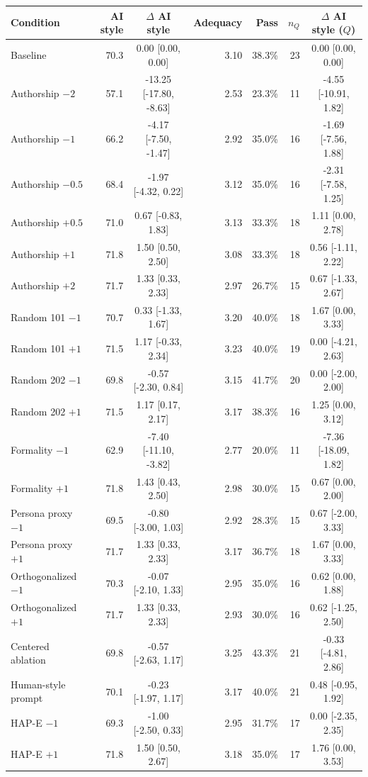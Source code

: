 \begin{tabular}{lrcrrrc}
\toprule
Condition & AI style & $\Delta$ AI style & Adequacy & Pass & $n_Q$ & $\Delta$ AI style ($Q$) \\
\midrule
Baseline & 70.3 & 0.00 [0.00, 0.00] & 3.10 & 38.3\% & 23 & 0.00 [0.00, 0.00] \\
Authorship $-2$ & 57.1 & -13.25 [-17.80, -8.63] & 2.53 & 23.3\% & 11 & -4.55 [-10.91, 1.82] \\
Authorship $-1$ & 66.2 & -4.17 [-7.50, -1.47] & 2.92 & 35.0\% & 16 & -1.69 [-7.56, 1.88] \\
Authorship $-0.5$ & 68.4 & -1.97 [-4.32, 0.22] & 3.12 & 35.0\% & 16 & -2.31 [-7.58, 1.25] \\
Authorship $+0.5$ & 71.0 & 0.67 [-0.83, 1.83] & 3.13 & 33.3\% & 18 & 1.11 [0.00, 2.78] \\
Authorship $+1$ & 71.8 & 1.50 [0.50, 2.50] & 3.08 & 33.3\% & 18 & 0.56 [-1.11, 2.22] \\
Authorship $+2$ & 71.7 & 1.33 [0.33, 2.33] & 2.97 & 26.7\% & 15 & 0.67 [-1.33, 2.67] \\
Random 101 $-1$ & 70.7 & 0.33 [-1.33, 1.67] & 3.20 & 40.0\% & 18 & 1.67 [0.00, 3.33] \\
Random 101 $+1$ & 71.5 & 1.17 [-0.33, 2.34] & 3.23 & 40.0\% & 19 & 0.00 [-4.21, 2.63] \\
Random 202 $-1$ & 69.8 & -0.57 [-2.30, 0.84] & 3.15 & 41.7\% & 20 & 0.00 [-2.00, 2.00] \\
Random 202 $+1$ & 71.5 & 1.17 [0.17, 2.17] & 3.17 & 38.3\% & 16 & 1.25 [0.00, 3.12] \\
Formality $-1$ & 62.9 & -7.40 [-11.10, -3.82] & 2.77 & 20.0\% & 11 & -7.36 [-18.09, 1.82] \\
Formality $+1$ & 71.8 & 1.43 [0.43, 2.50] & 2.98 & 30.0\% & 15 & 0.67 [0.00, 2.00] \\
Persona proxy $-1$ & 69.5 & -0.80 [-3.00, 1.03] & 2.92 & 28.3\% & 15 & 0.67 [-2.00, 3.33] \\
Persona proxy $+1$ & 71.7 & 1.33 [0.33, 2.33] & 3.17 & 36.7\% & 18 & 1.67 [0.00, 3.33] \\
Orthogonalized $-1$ & 70.3 & -0.07 [-2.10, 1.33] & 2.95 & 35.0\% & 16 & 0.62 [0.00, 1.88] \\
Orthogonalized $+1$ & 71.7 & 1.33 [0.33, 2.33] & 2.93 & 30.0\% & 16 & 0.62 [-1.25, 2.50] \\
Centered ablation & 69.8 & -0.57 [-2.63, 1.17] & 3.25 & 43.3\% & 21 & -0.33 [-4.81, 2.86] \\
Human-style prompt & 70.1 & -0.23 [-1.97, 1.17] & 3.17 & 40.0\% & 21 & 0.48 [-0.95, 1.92] \\
HAP-E $-1$ & 69.3 & -1.00 [-2.50, 0.33] & 2.95 & 31.7\% & 17 & 0.00 [-2.35, 2.35] \\
HAP-E $+1$ & 71.8 & 1.50 [0.50, 2.67] & 3.18 & 35.0\% & 17 & 1.76 [0.00, 3.53] \\
\bottomrule
\end{tabular}
